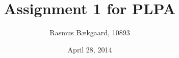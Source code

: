 








\usepackage[left=3cm,right=2cm,top=2.5cm,bottom=2cm]{geometry}

\linespread{1.5}

\title{Assignment 1 for PLPA}
\author{Rasmus Bækgaard, 10893}
\date{April 28, 2014}